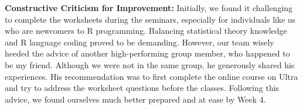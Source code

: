\documentclass[11pt]{article} %
\begin{document}
% 
% 
% 
\begin{mdframed}[
    backgroundcolor=white,  %
    linecolor=black,        %
    leftmargin=5pt,         %
    rightmargin=5pt,        %
    linewidth=2pt           %
]
\textbf{Constructive Criticism for Improvement: }
Initially, we found it challenging to complete the worksheets during the seminars, especially for individuals like us who are newcomers to R programming. Balancing statistical theory knowledge and R language coding proved to be demanding. However, our team wisely heeded the advice of another high-performing group member, who happened to be my friend. Although we were not in the same group, he generously shared his experiences. His recommendation was to first complete the online course on Ultra and try to address the worksheet questions before the classes. Following this advice, we found ourselves much better prepared and at ease by Week 4.
% 
\end{mdframed}
% 
% 
% 
% 
% 
% 
% 
% 
% 
% 
% 
\end{document}
